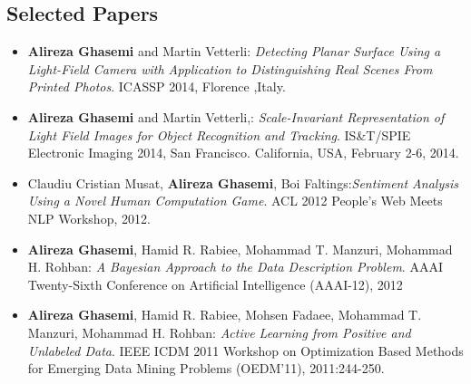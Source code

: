 \documentclass[a4paper]{article}
\theoremstyle{definition}
\begin{document}
\subsection{Selected Papers}
\begin{itemize}

\item \textbf{Alireza Ghasemi} and Martin Vetterli:\textit{ Detecting Planar Surface Using a Light-Field Camera with Application
to Distinguishing Real Scenes From Printed Photos}.  ICASSP 2014, Florence ,Italy.



\item \textbf{Alireza Ghasemi} and Martin Vetterli,:\textit{ Scale-Invariant Representation of Light Field Images for Object Recognition and Tracking}.  IS\&T/SPIE Electronic Imaging 2014, San Francisco. California, USA, February 2-6, 2014.



\item Claudiu Cristian Musat, \textbf{Alireza Ghasemi}, Boi Faltings:\textit{Sentiment Analysis Using a Novel Human Computation Game}.  ACL 2012 People's Web Meets NLP Workshop, 2012.

\item \textbf{Alireza Ghasemi}, Hamid R. Rabiee,  Mohammad T. Manzuri, Mohammad H. Rohban:\textit{ A Bayesian Approach to the Data Description Problem}.  AAAI Twenty-Sixth Conference on Artificial Intelligence (AAAI-12), 2012


\item \textbf{Alireza Ghasemi}, Hamid R. Rabiee, Mohsen Fadaee, Mohammad T. Manzuri, Mohammad H. Rohban:\textit{ Active Learning from Positive and Unlabeled Data}. IEEE ICDM 2011 Workshop on Optimization Based Methods for Emerging Data Mining Problems (OEDM'11), 2011:244-250.


\end{itemize}
\end{document}
